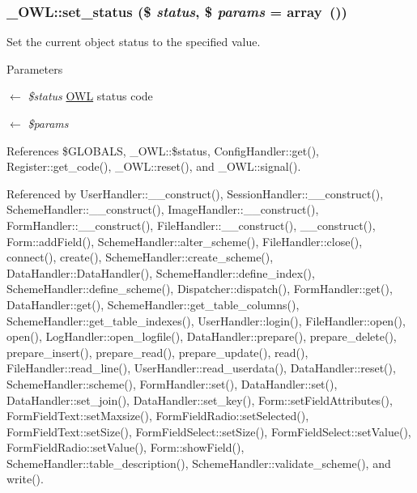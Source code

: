 \subsubsection[{set\_\-status}]{\setlength{\rightskip}{0pt plus 5cm}\_\-OWL::set\_\-status (\$ {\em status}, \/  \$ {\em params} = {\ttfamily array~()})}\label{class__OWL_aea912d0ede9b3c2a69b79072d94d4787}
Set the current object status to the specified value.


\begin{DoxyParams}{Parameters}
\item[\mbox{$\leftarrow$} {\em \$status}]\hyperlink{classOWL}{OWL} status code \item[\mbox{$\leftarrow$} {\em \$params}]\end{DoxyParams}


References \$GLOBALS, \_\-OWL::\$status, ConfigHandler::get(), Register::get\_\-code(), \_\-OWL::reset(), and \_\-OWL::signal().



Referenced by UserHandler::\_\-\_\-construct(), SessionHandler::\_\-\_\-construct(), SchemeHandler::\_\-\_\-construct(), ImageHandler::\_\-\_\-construct(), FormHandler::\_\-\_\-construct(), FileHandler::\_\-\_\-construct(), \_\-\_\-construct(), Form::addField(), SchemeHandler::alter\_\-scheme(), FileHandler::close(), connect(), create(), SchemeHandler::create\_\-scheme(), DataHandler::DataHandler(), SchemeHandler::define\_\-index(), SchemeHandler::define\_\-scheme(), Dispatcher::dispatch(), FormHandler::get(), DataHandler::get(), SchemeHandler::get\_\-table\_\-columns(), SchemeHandler::get\_\-table\_\-indexes(), UserHandler::login(), FileHandler::open(), open(), LogHandler::open\_\-logfile(), DataHandler::prepare(), prepare\_\-delete(), prepare\_\-insert(), prepare\_\-read(), prepare\_\-update(), read(), FileHandler::read\_\-line(), UserHandler::read\_\-userdata(), DataHandler::reset(), SchemeHandler::scheme(), FormHandler::set(), DataHandler::set(), DataHandler::set\_\-join(), DataHandler::set\_\-key(), Form::setFieldAttributes(), FormFieldText::setMaxsize(), FormFieldRadio::setSelected(), FormFieldText::setSize(), FormFieldSelect::setSize(), FormFieldSelect::setValue(), FormFieldRadio::setValue(), Form::showField(), SchemeHandler::table\_\-description(), SchemeHandler::validate\_\-scheme(), and write().

